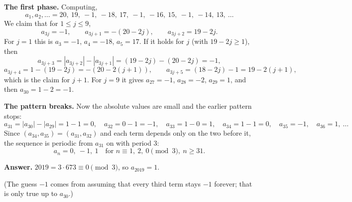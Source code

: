 \textbf{The first phase.} Computing,
\[a_1,a_2,\dots=20,\ 19,\ -1,\ -18,\ 17,\ -1,\ -16,\ 15,\ -1,\ -14,\ 13,\ \dots\]
We claim that for $1\le j\le9$,
\[a_{3j}=-1,\qquad a_{3j+1}=-(20-2j),\qquad a_{3j+2}=19-2j.\]
For $j=1$ this is $a_3=-1$, $a_4=-18$, $a_5=17$. If it holds for $j$ (with $19-2j\ge1$), then
\[a_{3j+3}=|a_{3j+2}|-|a_{3j+1}|=(19-2j)-(20-2j)=-1,\]
\[a_{3j+4}=1-(19-2j)=-(20-2(j+1)),\qquad a_{3j+5}=(18-2j)-1=19-2(j+1),\]
which is the claim for $j+1$. For $j=9$ it gives $a_{27}=-1$, $a_{28}=-2$, $a_{29}=1$, and then $a_{30}=1-2=-1$.

\textbf{The pattern breaks.} Now the absolute values are small and the earlier pattern stops:
\[a_{31}=|a_{30}|-|a_{29}|=1-1=0,\quad a_{32}=0-1=-1,\quad a_{33}=1-0=1,\quad a_{34}=1-1=0,\quad a_{35}=-1,\quad a_{36}=1,\ \dots\]
Since $(a_{34},a_{35})=(a_{31},a_{32})$ and each term depends only on the two before it, the sequence is periodic from $a_{31}$ on with period $3$:
\[a_n=0,\ -1,\ 1\quad\text{for } n\equiv1,\ 2,\ 0\pmod 3,\ n\ge31.\]

\textbf{Answer.} $2019=3\cdot673\equiv0\pmod3$, so $a_{2019}=\boxed{1}$.

(The guess $-1$ comes from assuming that every third term stays $-1$ forever; that is only true up to $a_{30}$.)
